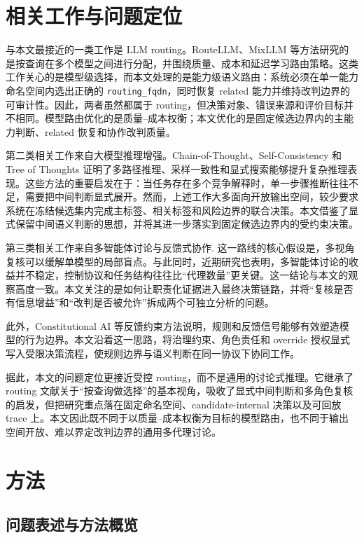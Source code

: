 \documentclass[11pt,a4paper]{ctexart}
\begin{document}
\section{相关工作与问题定位}

与本文最接近的一类工作是 LLM routing。RouteLLM、MixLLM 等方法研究的是按查询在多个模型之间进行分配，并围绕质量、成本和延迟学习路由策略\cite{routellm,mixllm}。这类工作关心的是模型级选择，而本文处理的是能力级语义路由：系统必须在单一能力命名空间内选出正确的 \texttt{routing\_fqdn}，同时恢复 related 能力并维持改判边界的可审计性。因此，两者虽然都属于 routing，但决策对象、错误来源和评价目标并不相同。模型路由优化的是质量--成本权衡；本文优化的是固定候选边界内的主能力判断、related 恢复和协作改判质量。

第二类相关工作来自大模型推理增强。Chain-of-Thought、Self-Consistency 和 Tree of Thoughts 证明了多路径推理、采样一致性和显式搜索能够提升复杂推理表现\cite{cot,selfconsistency,tot}。这些方法的重要启发在于：当任务存在多个竞争解释时，单一步骤推断往往不足，需要把中间判断显式展开。然而，上述工作大多面向开放输出空间，较少要求系统在冻结候选集内完成主标签、相关标签和风险边界的联合决策。本文借鉴了显式保留中间语义判断的思想，并将其进一步落实到固定候选边界内的受约束决策。

第三类相关工作来自多智能体讨论与反馈式协作\cite{debate}. 这一路线的核心假设是，多视角复核可以缓解单模型的局部盲点。与此同时，近期研究也表明，多智能体讨论的收益并不稳定，控制协议和任务结构往往比“代理数量”更关键\cite{bounds}。这一结论与本文的观察高度一致。本文关注的是如何让职责化证据进入最终决策链路，并将“复核是否有信息增益”和“改判是否被允许”拆成两个可独立分析的问题。

此外，Constitutional AI 等反馈约束方法说明，规则和反馈信号能够有效塑造模型的行为边界\cite{cai}。本文沿着这一思路，将治理约束、角色责任和 override 授权显式写入受限决策流程，使规则边界与语义判断在同一协议下协同工作。

据此，本文的问题定位更接近受控 routing，而不是通用的讨论式推理。它继承了 routing 文献关于“按查询做选择”的基本视角，吸收了显式中间判断和多角色复核的启发，但把研究重点落在固定命名空间、candidate-internal 决策以及可回放 trace 上。本文因此既不同于以质量--成本权衡为目标的模型路由，也不同于输出空间开放、难以界定改判边界的通用多代理讨论。

\section{方法}

\subsection{问题表述与方法概览}
\end{document}
